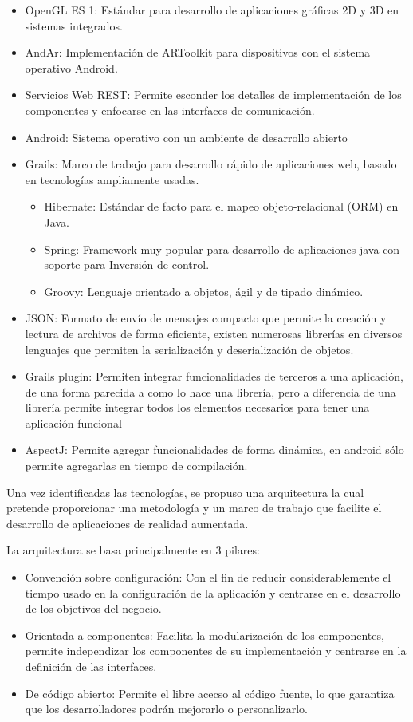 \documentclass[12pt,a4paper,spanish,openany]{book}
\begin{document}
\begin{itemize}
  \item OpenGL ES 1: Estándar para desarrollo de aplicaciones gráficas 2D y 3D
  en sistemas integrados.
  \item AndAr: Implementación de ARToolkit para dispositivos con el sistema
  operativo Android.
  \item Servicios Web REST: Permite esconder los detalles de implementación de
  los componentes y enfocarse en las interfaces de comunicación.
  \item Android: Sistema operativo con un ambiente de desarrollo abierto 
  \item Grails: Marco de trabajo para desarrollo rápido de aplicaciones web,
  basado en tecnologías ampliamente usadas.
  \begin{itemize}
    \item Hibernate: Estándar de facto para el mapeo objeto-relacional (ORM) en
    Java.
    \item Spring: Framework muy popular para desarrollo de aplicaciones java con
    soporte para Inversión de control.
    \item Groovy: Lenguaje orientado a objetos, ágil y de tipado dinámico.
  \end{itemize}
  \item JSON: Formato de envío de mensajes compacto que permite la creación y
  lectura de archivos de forma eficiente, existen numerosas librerías en
  diversos lenguajes que permiten la serialización y deserialización de objetos.
  \item Grails plugin: Permiten integrar funcionalidades de terceros a una
  aplicación, de una forma parecida a como lo hace una librería, pero a
  diferencia de una librería permite integrar todos los elementos necesarios
  para tener una aplicación funcional
  \item AspectJ: Permite agregar funcionalidades de forma dinámica, en android
  sólo permite agregarlas en tiempo de compilación.
\end{itemize}


Una vez identificadas las tecnologías, se propuso una arquitectura la cual
pretende proporcionar una metodología y un marco de trabajo que facilite el
desarrollo de aplicaciones de realidad aumentada.

La arquitectura se basa principalmente en 3 pilares:

\begin{itemize}
  \item Convención sobre configuración: Con el fin de reducir considerablemente
  el tiempo usado en la configuración de la aplicación y centrarse en el
  desarrollo de los objetivos del negocio.
  \item Orientada a componentes: Facilita la modularización de los componentes,
  permite independizar los componentes de su implementación y centrarse en la
  definición de las interfaces.
  \item De código abierto: Permite el libre acecso al código fuente, lo que
  garantiza que los desarrolladores podrán mejorarlo o personalizarlo.
\end{itemize}
\end{document}
